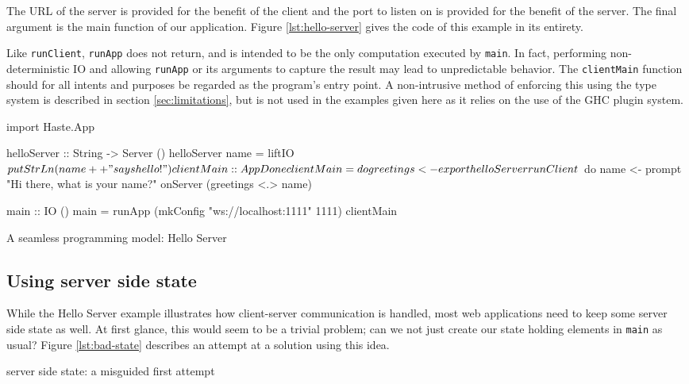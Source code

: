 \documentclass[preprint]{sigplanconf}
\begin{document}
The URL of the server is provided for the benefit of the client and the port
to listen on is provided for the benefit of the server. The final argument is
the main function of our application. Figure \ref{lst:hello-server} gives the
code of this example in its entirety.

Like \lstinline!runClient!, \lstinline!runApp! does not return, and is intended
to be the only computation executed by \lstinline!main!. In fact, performing
non-deterministic IO and allowing \lstinline!runApp! or its arguments to
capture the result may lead to unpredictable behavior. The \lstinline!clientMain!
function should for all intents and purposes be regarded as the program's entry
point. A non-intrusive method of enforcing this using the type system is
described in section \ref{sec:limitations}, but is not used in the examples
given here as it relies on the use of the GHC plugin system.

\begin{listingfloat}
\begin{code}
import Haste.App

helloServer :: String -> Server ()
helloServer name =
  liftIO $ putStrLn (name ++ " says hello!")

clientMain :: App Done
clientMain = do
  greetings <- export helloServer

  runClient $ do
    name <- prompt "Hi there, what is your name?"
    onServer (greetings <.> name)

main :: IO ()
main = runApp (mkConfig "ws://localhost:1111" 1111)
              clientMain
\end{code}
\caption{A seamless programming model: Hello Server}
\label{lst:hello-server}
\end{listingfloat}

\subsection{Using server side state}

While the Hello Server example illustrates how client-server communication is
handled, most web applications need to keep some server side state as well.
At first glance, this would seem to be a trivial problem; can we not just
create our state holding elements in \lstinline!main! as usual?
Figure \ref{lst:bad-state} describes an attempt at a solution using this idea.

\begin{listingfloat}
\caption{server side state: a misguided first attempt}
\label{lst:bad-state}
\end{listingfloat}
\end{document}
